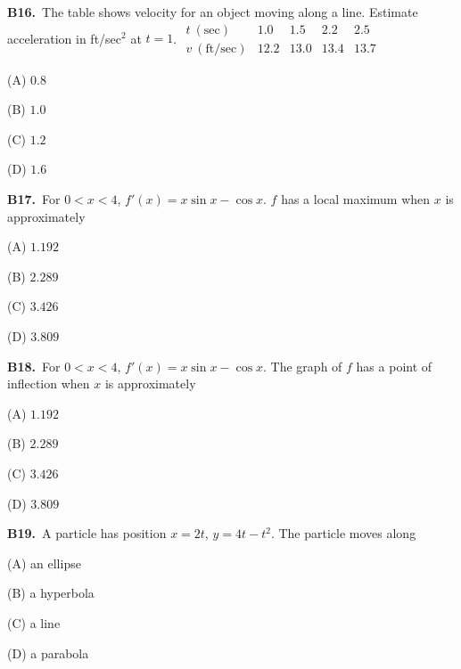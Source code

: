 \documentclass[11pt]{article}
\begin{document}
\bigskip\noindent\textbf{B16.}\ The table shows velocity for an object moving along a line. Estimate acceleration in ft/sec$^2$ at $t=1$. $\begin{array}{c|rrrr}t\ (\mathrm{sec})&1.0&1.5&2.2&2.5\\v\ (\mathrm{ft/sec})&12.2&13.0&13.4&13.7\end{array}$
\begin{list}{}{\setlength{\leftmargin}{3em}\setlength{\labelwidth}{2.5em}\setlength{\itemsep}{0pt}\setlength{\topsep}{2pt}}
\item[(A)] $0.8$
\item[(B)] $1.0$
\item[(C)] $1.2$
\item[(D)] $1.6$
\end{list}

\bigskip\noindent\textbf{B17.}\ For $0<x<4$, $f\prime(x)=x\sin x-\cos x$. $f$ has a local maximum when $x$ is approximately
\begin{list}{}{\setlength{\leftmargin}{3em}\setlength{\labelwidth}{2.5em}\setlength{\itemsep}{0pt}\setlength{\topsep}{2pt}}
\item[(A)] $1.192$
\item[(B)] $2.289$
\item[(C)] $3.426$
\item[(D)] $3.809$
\end{list}

\bigskip\noindent\textbf{B18.}\ For $0<x<4$, $f\prime(x)=x\sin x-\cos x$. The graph of $f$ has a point of inflection when $x$ is approximately
\begin{list}{}{\setlength{\leftmargin}{3em}\setlength{\labelwidth}{2.5em}\setlength{\itemsep}{0pt}\setlength{\topsep}{2pt}}
\item[(A)] $1.192$
\item[(B)] $2.289$
\item[(C)] $3.426$
\item[(D)] $3.809$
\end{list}

\bigskip\noindent\textbf{B19.}\ A particle has position $x=2t$, $y=4t-t^2$. The particle moves along
\begin{list}{}{\setlength{\leftmargin}{3em}\setlength{\labelwidth}{2.5em}\setlength{\itemsep}{0pt}\setlength{\topsep}{2pt}}
\item[(A)] an ellipse
\item[(B)] a hyperbola
\item[(C)] a line
\item[(D)] a parabola
\end{list}
\end{document}
